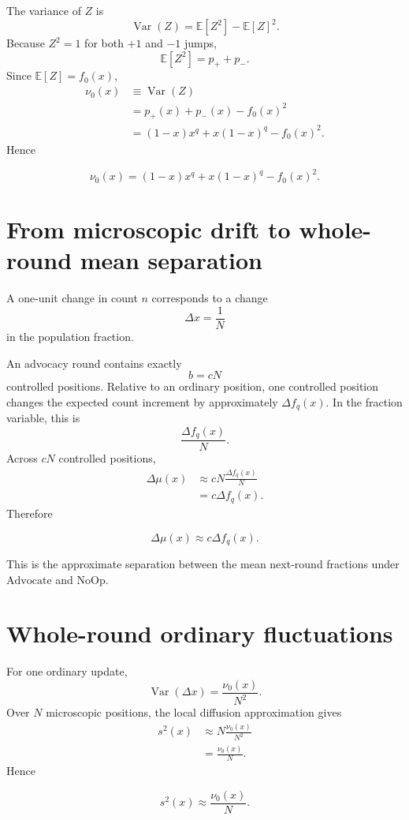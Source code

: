 \documentclass[11pt,a4paper]{article}
\newcommand{\Adv}{\ensuremath{\mathrm{Advocate}}}
\newcommand{\NoOp}{\ensuremath{\mathrm{NoOp}}}
\newcommand{\E}{\mathbb{E}}
\newcommand{\Var}{\operatorname{Var}}
\newcommand{\1}{\mathbbm{1}}
\begin{document}
The variance of $Z$ is
\begin{equation}
\Var(Z)=\E[Z^2]-\E[Z]^2.
\end{equation}
Because $Z^2=1$ for both $+1$ and $-1$ jumps,
\[
\E[Z^2]=p_++p_-.
\]
Since $\E[Z]=f_0(x)$,
\begin{align}
\nu_0(x)
&\equiv\Var(Z)\\
&=p_+(x)+p_-(x)-f_0(x)^2\\
&=(1-x)x^q+x(1-x)^q-f_0(x)^2.
\end{align}
Hence
\begin{resultbox}
\begin{equation}
\boxed{
\nu_0(x)=(1-x)x^q+x(1-x)^q-f_0(x)^2.}
\label{eq:nu0}
\end{equation}
\end{resultbox}

\section{From microscopic drift to whole-round mean separation}

A one-unit change in count $n$ corresponds to a change
\[
\Delta x=\frac{1}{N}
\]
in the population fraction.

An advocacy round contains exactly
\[
b=cN
\]
controlled positions. Relative to an ordinary position, one controlled position changes the expected count increment by approximately $\Delta f_q(x)$. In the fraction variable, this is
\[
\frac{\Delta f_q(x)}{N}.
\]
Across $cN$ controlled positions,
\begin{align}
\Delta\mu(x)
&\approx cN\frac{\Delta f_q(x)}{N}\\
&=c\Delta f_q(x).
\end{align}
Therefore
\begin{resultbox}
\begin{equation}
\boxed{\Delta\mu(x)\approx c\Delta f_q(x).}
\label{eq:deltamu}
\end{equation}
\end{resultbox}
This is the approximate separation between the mean next-round fractions under $\Adv$ and $\NoOp$.

\section{Whole-round ordinary fluctuations}

For one ordinary update,
\[
\Var(\Delta x)=\frac{\nu_0(x)}{N^2}.
\]
Over $N$ microscopic positions, the local diffusion approximation gives
\begin{align}
s^2(x)
&\approx N\frac{\nu_0(x)}{N^2}\\
&=\frac{\nu_0(x)}{N}.
\end{align}
Hence
\begin{resultbox}
\begin{equation}
\boxed{s^2(x)\approx\frac{\nu_0(x)}{N}.}
\label{eq:roundvar}
\end{equation}
\end{resultbox}
\end{document}
